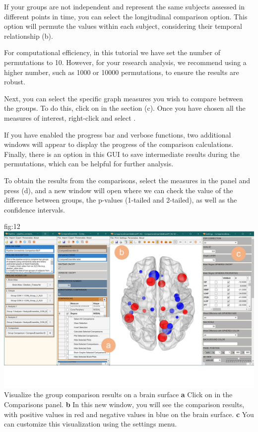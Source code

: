 \documentclass[justified]{tufte-handout}
\begin{document}
If your groups are not independent and represent the same subjects assessed in different points in time, you can select the longitudinal comparison option. This option will permute the values within each subject, considering their temporal relationship (b).

For computational efficiency, in this tutorial we have set the number of permutations to 10. However, for your research analysis, we recommend using a higher number, such as 1000 or 10000 permutations, to ensure the results are robust.

Next, you can select the specific graph measures you wish to compare between the groups. To do this, click on  in the  section (c). Once you have chosen all the measures of interest, right-click and select .

If you have enabled the progress bar and verbose functions, two additional windows will appear to display the progress of the comparison calculations. Finally, there is an option in this GUI to save intermediate results during the permutations, which can be helpful for further analysis.
 
To obtain the results from the comparisons, select the measures in the  panel and press ({d}), and a new window will open where we can check the value of the difference between groups, the p-values (1-tailed and 2-tailed), as well as the confidence intervals.

	{fig:12}
	{
	\includegraphics{fig12.jpg}
	}
	{Visualize the group comparison results on a brain surface}
	{
	{\bf a} Click on  in the Comparisons panel.
	{\bf b} In this new window, you will see the comparison results, with positive values in red and negative values in blue on the brain surface.
{\bf c} You can customize this visualization using the settings menu.
	}
\end{document}

